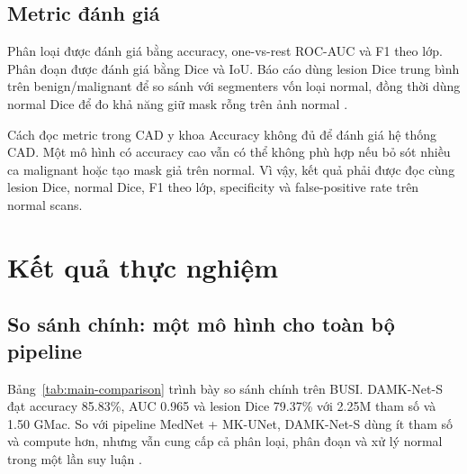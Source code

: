 \documentclass[12pt,a4paper,oneside]{report}
\newcommand{\modelnames}{DAMK-Net-S}
\begin{document}
\section{Metric đánh giá}

Phân loại được đánh giá bằng accuracy, one-vs-rest ROC-AUC và F1 theo lớp. Phân đoạn được đánh giá bằng Dice và IoU. Báo cáo dùng lesion Dice trung bình trên benign/malignant để so sánh với segmenters vốn loại normal, đồng thời dùng normal Dice để đo khả năng giữ mask rỗng trên ảnh normal \citep{diceloss,taha2015,damknet}.

\begin{cautionbox}{Cách đọc metric trong CAD y khoa}
Accuracy không đủ để đánh giá hệ thống CAD. Một mô hình có accuracy cao vẫn có thể không phù hợp nếu bỏ sót nhiều ca malignant hoặc tạo mask giả trên normal. Vì vậy, kết quả phải được đọc cùng lesion Dice, normal Dice, F1 theo lớp, specificity và false-positive rate trên normal scans.
\end{cautionbox}

\chapter{Kết quả thực nghiệm}

\section{So sánh chính: một mô hình cho toàn bộ pipeline}

Bảng~\ref{tab:main-comparison} trình bày so sánh chính trên BUSI. \modelnames{} đạt accuracy 85.83\%, AUC 0.965 và lesion Dice 79.37\% với 2.25M tham số và 1.50 GMac. So với pipeline MedNet + MK-UNet, \modelnames{} dùng ít tham số và compute hơn, nhưng vẫn cung cấp cả phân loại, phân đoạn và xử lý normal trong một lần suy luận \citep{mednet,mkunet,damknet}.
\end{document}
